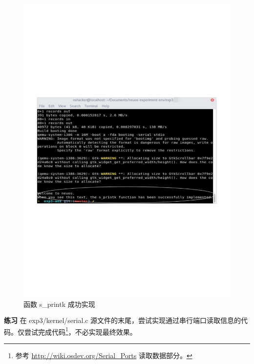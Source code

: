 \begin{figure}[htbp]
    \centering
    \includegraphics[width=\textwidth]{img/函数s_printk成功实现.pdf}
    \caption{函数 s\_printk 成功实现}
    \label{fig:函数sprintk成功实现}
\end{figure}

\begin{mdframed}[hidealllines=true,backgroundcolor=gray!20]
\textbf{练习 }在 exp3/kernel/serial.c 源文件的末尾，尝试实现通过串行端口读取信息的代码。仅尝试完成代码\footnote{参考 \url{http://wiki.osdev.org/Serial_Ports} 读取数据部分。}，不必实现最终效果。
\end{mdframed}

